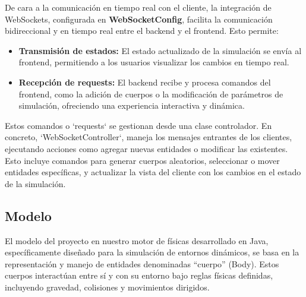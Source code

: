 De cara a la comunicación en tiempo real con el cliente, la integración de WebSockets, configurada en \textbf{WebSocketConfig}, facilita la comunicación bidireccional y en tiempo real entre el backend y el frontend. 
Esto permite:
\begin{itemize}
    \item \textbf{Transmisión de estados:} El estado actualizado de la simulación se envía al frontend, permitiendo a los usuarios visualizar los cambios en tiempo real.
    \item \textbf{Recepción de requests:} El backend recibe y procesa comandos del frontend, como la adición de cuerpos o la modificación de parámetros de simulación, ofreciendo una experiencia interactiva y dinámica.
\end{itemize}
Estos comandos o `requests` se gestionan desde una clase controlador. En concreto, `WebSocketController`, maneja los mensajes entrantes de los clientes, ejecutando acciones como agregar nuevas entidades o modificar las existentes. Esto incluye comandos para generar cuerpos aleatorios, seleccionar o mover entidades específicas, y actualizar la vista del cliente con los cambios en el estado de la simulación.

\subsection{Modelo}
El modelo del proyecto en nuestro motor de físicas desarrollado en Java, específicamente diseñado para la simulación de entornos dinámicos, se basa en la representación y manejo de entidades denominadas ``cuerpo'' (Body). Estos cuerpos interactúan entre sí y con su entorno bajo reglas físicas definidas, incluyendo gravedad, colisiones y movimientos dirigidos.
